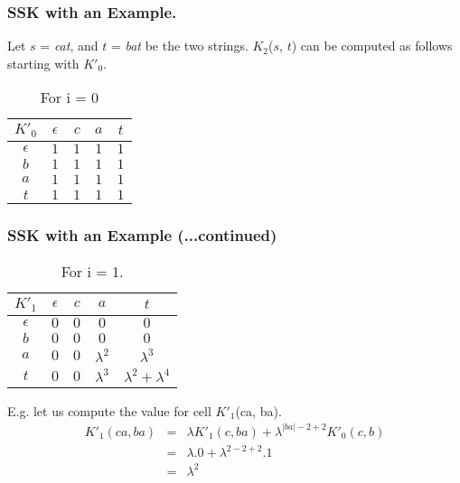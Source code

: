 \documentclass[10pt]{beamer}
\begin{document}
\begin{frame}
	\frametitle{SSK with an Example.}
	Let $s$ = \textit{cat}, and $t$ = \textit{bat} be the two strings. $K_2$($s$, $t$) can be computed as follows starting with $K'_0$.
	\begin{table}[h]
   \caption{For i = 0} %
	\begin{tabular}{| c | c | c | c | c |}  %
	\hline
	$K'_0$ & $\epsilon$ & $c$ & $a$ & $t$ \\%
	\hline\hline
	$\epsilon$ & $1$ & $1$ & $1$ & $1$\\ \hline
	$b$ & $1$ & $1$ & $1$ & $1$\\ \hline
	$a$ & $1$ & $1$ & $1$ & $1$\\ \hline
	$t$ & $1$ & $1$ & $1$ & $1$\\ \hline							   
	\hline
	\end{tabular}
	\label{tab:hresult}
	\end{table}
\end{frame}

\begin{frame}
	\frametitle{SSK with an Example (...continued)}

	\begin{table}[h]
   \caption{For i = 1.} %
	\begin{tabular}{| c | c | c | c | c |}  %
	\hline
	$K'_1$ & $\epsilon$ & $c$ & $a$ & $t$ \\  %
	\hline\hline
	$\epsilon$ & $0$ & $0$ & $0$ & $0$\\ \hline
	$b$ & $0$ & $0$ & $0$ & $0$\\ \hline   
	$a$ & $0$ & $0$ & $\lambda^2$ & $\lambda^3$\\ \hline
	$t$ & $0$ & $0$ & $\lambda^3$ & $\lambda^2+\lambda^4$\\ \hline
	\hline
	\end{tabular}
	\label{tab:hresult}
	\end{table}

	E.g. let us compute the value for cell $K'_1$(ca, ba). 
	\begin{eqnarray*}
		K'_1(ca, ba) & = & \lambda K'_1(c,ba) + \lambda^{|ba| - 2 + 2} K'_0(c, b)\\
			& = & \lambda . 0 + \lambda^{2 - 2 + 2} . 1\\
			& = & \lambda^2 \\
	\end{eqnarray*}
\end{frame}
\end{document}
